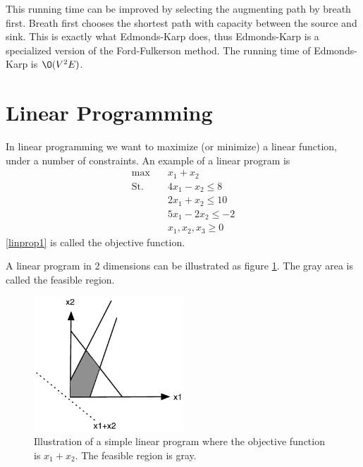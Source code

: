 \documentclass[10pt]{article}
\begin{document}
This running time can be improved by selecting the augmenting path by breath first. Breath first chooses the shortest path with capacity between the source and sink. This is exactly what Edmonds-Karp does, thus Edmonds-Karp is a specialized version of the Ford-Fulkerson method. The running time of Edmonds-Karp is $\O(V^2E)$.




\section{Linear Programming} %
\label{sec:linear_programming}

In linear programming we want to maximize (or minimize) a linear function, under a number of constraints. An example of a linear program is
\begin{align}
 \max &\quad x_1 + x_2  \label{linprop1}\\ 
 \text{St.} &\quad  4x_1 - x_2  \leq 8 \nonumber\\
            &\quad  2x_1 + x_2  \leq 10 \nonumber\\
            &\quad  5x_1 - 2x_2 \leq -2 \nonumber\\            
            &\quad  x_1,x_2,x_3 \geq 0  \nonumber
\end{align}
\ref{linprop1} is called the objective function.
                                                                      
A linear program in 2 dimensions can be illustrated as figure \ref{fig3}. The gray area is called the feasible region.
\begin{figure}[ht]
\centering
\includegraphics[width=0.5\textwidth]{figures/fig3.pdf}
\caption{Illustration of a simple linear program where the objective function is $x_1 + x_2$. The feasible region is gray.}
\label{fig3}
\end{figure}
\end{document}
